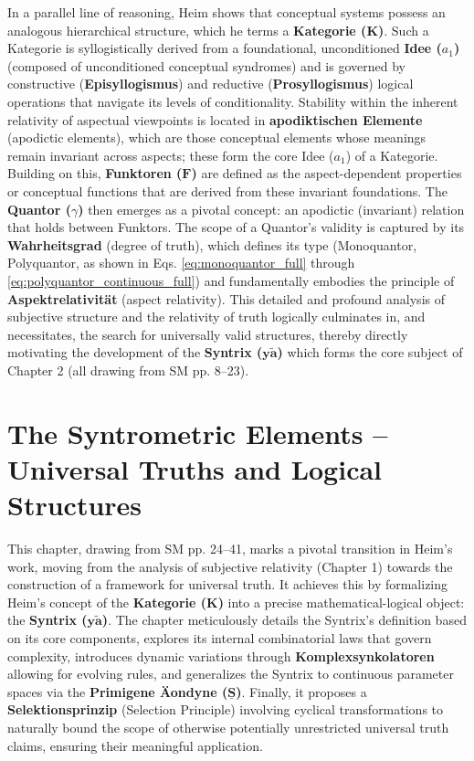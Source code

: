 \documentclass[12pt]{article}
\newcommand{\kategorie}{\bm{K}}
\newcommand{\syntrix}{\bm{y\widetilde{a}}}
\newcommand{\conceptualsyndrome}{a}
\newcommand{\funktor}{\bm{F}}
\begin{document}
In a parallel line of reasoning, Heim shows that conceptual systems possess an analogous hierarchical structure, which he terms a \textbf{Kategorie (\(\kategorie\))}. Such a Kategorie is syllogistically derived from a foundational, unconditioned \textbf{Idee (\(\conceptualsyndrome_1\))} (composed of unconditioned conceptual syndromes) and is governed by constructive (\textbf{Episyllogismus}) and reductive (\textbf{Prosyllogismus}) logical operations that navigate its levels of conditionality. Stability within the inherent relativity of aspectual viewpoints is located in \textbf{apodiktischen Elemente} (apodictic elements), which are those conceptual elements whose meanings remain invariant across aspects; these form the core Idee (\(\conceptualsyndrome_1\)) of a Kategorie. Building on this, \textbf{Funktoren (\(\funktor\))} are defined as the aspect-dependent properties or conceptual functions that are derived from these invariant foundations. The \textbf{Quantor (\(\gamma\))} then emerges as a pivotal concept: an apodictic (invariant) relation that holds between Funktors. The scope of a Quantor's validity is captured by its \textbf{Wahrheitsgrad} (degree of truth), which defines its type (Monoquantor, Polyquantor, as shown in Eqs. \eqref{eq:monoquantor_full} through \eqref{eq:polyquantor_continuous_full}) and fundamentally embodies the principle of \textbf{Aspektrelativität} (aspect relativity). This detailed and profound analysis of subjective structure and the relativity of truth logically culminates in, and necessitates, the search for universally valid structures, thereby directly motivating the development of the \textbf{Syntrix (\(\syntrix\))} which forms the core subject of Chapter 2 (all drawing from SM pp. 8--23).

\clearpage

\section{The Syntrometric Elements – Universal Truths and Logical Structures}
\label{sec:chapter2}

This chapter, drawing from SM pp. 24--41, marks a pivotal transition in Heim's work, moving from the analysis of subjective relativity (Chapter 1) towards the construction of a framework for universal truth. It achieves this by formalizing Heim's concept of the \textbf{Kategorie (\(\kategorie\))} into a precise mathematical-logical object: the \textbf{Syntrix (\(\syntrix\))}. The chapter meticulously details the Syntrix's definition based on its core components, explores its internal combinatorial laws that govern complexity, introduces dynamic variations through \textbf{Komplexsynkolatoren} allowing for evolving rules, and generalizes the Syntrix to continuous parameter spaces via the \textbf{Primigene \"{A}ondyne (\(\underline{\bm{S}}\))}. Finally, it proposes a \textbf{Selektionsprinzip} (Selection Principle) involving cyclical transformations to naturally bound the scope of otherwise potentially unrestricted universal truth claims, ensuring their meaningful application.
\end{document}
